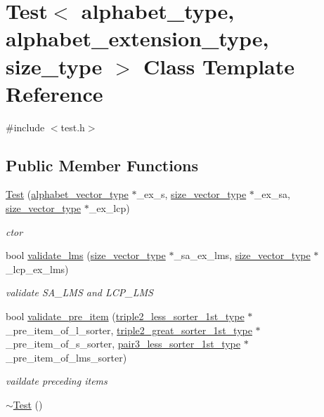 \hypertarget{class_test}{}\section{Test$<$ alphabet\+\_\+type, alphabet\+\_\+extension\+\_\+type, size\+\_\+type $>$ Class Template Reference}
\label{class_test}


{\ttfamily \#include $<$test.\+h$>$}

\subsection*{Public Member Functions}
\begin{DoxyCompactItemize}
\item 
\hyperlink{class_test_a9ca0652d8678a0c57e321fcc21f9ae39}{Test} (\hyperlink{class_test_aace52a5af52c5d5f457ec201881ab2ab}{alphabet\+\_\+vector\+\_\+type} $\ast$\+\_\+ex\+\_\+s, \hyperlink{class_test_a9290f9f05f2aac6555e7366cf214d186}{size\+\_\+vector\+\_\+type} $\ast$\+\_\+ex\+\_\+sa, \hyperlink{class_test_a9290f9f05f2aac6555e7366cf214d186}{size\+\_\+vector\+\_\+type} $\ast$\+\_\+ex\+\_\+lcp)
\begin{DoxyCompactList}\small\item\em ctor \end{DoxyCompactList}\item 
bool \hyperlink{class_test_ab5d1d239530c9b99ab1732e5d4008b87}{validate\+\_\+lms} (\hyperlink{class_test_a9290f9f05f2aac6555e7366cf214d186}{size\+\_\+vector\+\_\+type} $\ast$\+\_\+sa\+\_\+ex\+\_\+lms, \hyperlink{class_test_a9290f9f05f2aac6555e7366cf214d186}{size\+\_\+vector\+\_\+type} $\ast$\+\_\+lcp\+\_\+ex\+\_\+lms)
\begin{DoxyCompactList}\small\item\em validate S\+A\+\_\+\+L\+MS and L\+C\+P\+\_\+\+L\+MS \end{DoxyCompactList}\item 
bool \hyperlink{class_test_aed94eee4f2a73d02c0abbe448efe2095}{validate\+\_\+pre\+\_\+item} (\hyperlink{class_test_a1e7fba953871f5eee60eabf8b0e287b7}{triple2\+\_\+less\+\_\+sorter\+\_\+1st\+\_\+type} $\ast$\+\_\+pre\+\_\+item\+\_\+of\+\_\+l\+\_\+sorter, \hyperlink{class_test_ad87ac75730f80ef0824f0c56ec7db12d}{triple2\+\_\+great\+\_\+sorter\+\_\+1st\+\_\+type} $\ast$\+\_\+pre\+\_\+item\+\_\+of\+\_\+s\+\_\+sorter, \hyperlink{class_test_aa25f2080d593eb18d6e5e475d99bac17}{pair3\+\_\+less\+\_\+sorter\+\_\+1st\+\_\+type} $\ast$\+\_\+pre\+\_\+item\+\_\+of\+\_\+lms\+\_\+sorter)
\begin{DoxyCompactList}\small\item\em vaildate preceding items \end{DoxyCompactList}\item 
\hyperlink{class_test_acafab99b8fa6756de9998d16fc9e33f4}{$\sim$\+Test} ()
\end{DoxyCompactItemize}
